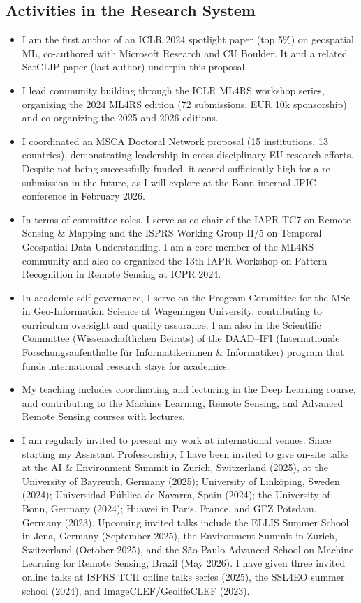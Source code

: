 \documentclass{scrartcl}
\begin{document}
\subsection*{Activities in the Research System}
\begin{itemize}
    \item I am the first author of an ICLR 2024 spotlight paper (top 5\%) on geospatial ML, co-authored with Microsoft Research and CU Boulder. It and a related SatCLIP paper (last author) underpin this proposal.
    \item I lead community building through the ICLR ML4RS workshop series, organizing the 2024 ML4RS edition (72 submissions, EUR 10k sponsorship) and co-organizing the 2025 and 2026 editions.
    \item I coordinated an MSCA Doctoral Network proposal (15 institutions, 13 countries), demonstrating leadership in cross-disciplinary EU research efforts. Despite not being successfully funded, it scored sufficiently high for a re-submission in the future, as I will explore at the Bonn-internal JPIC conference in February 2026.
    \item In terms of committee roles, I serve as co-chair of the IAPR TC7 on Remote Sensing \& Mapping and the ISPRS Working Group II/5 on Temporal Geospatial Data Understanding. I am a core member of the ML4RS community and also co-organized the 13th IAPR Workshop on Pattern Recognition in Remote Sensing at ICPR 2024.
    \item In academic self-governance, I serve on the Program Committee for the MSc in Geo-Information Science at Wageningen University, contributing to curriculum oversight and quality assurance. I am also in the Scientific Committee (Wissenschaftlichen Beirats) of the DAAD--IFI (Internationale Forschungsaufenthalte f\"ur Informatikerinnen \& Informatiker) program that funds international research stays for academics.
    \item My teaching includes coordinating and lecturing in the Deep Learning course, and contributing to the Machine Learning, Remote Sensing, and Advanced Remote Sensing courses with lectures.
    \item I am regularly invited to present my work at international venues. Since starting my Assistant Professorship, I have been invited to give on-site talks at the AI \& Environment Summit in Zurich, Switzerland (2025), at the University of Bayreuth, Germany (2025); University of Link\"oping, Sweden (2024); Universidad P\'ublica de Navarra, Spain (2024); the University of Bonn, Germany (2024); Huawei in Paris, France, and GFZ Potsdam, Germany (2023). Upcoming invited talks include the ELLIS Summer School in Jena, Germany (September 2025), the Environment Summit in Zurich, Switzerland (October 2025), and the S\~ao Paulo Advanced School on Machine Learning for Remote Sensing, Brazil (May 2026). I have given three invited online talks at ISPRS TCII online talks series (2025), the SSL4EO summer school (2024), and ImageCLEF/GeolifeCLEF (2023).
\end{itemize}
\end{document}
